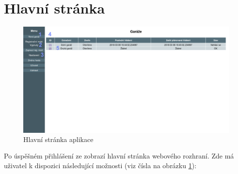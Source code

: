 \newpage

\section{Hlavní stránka}

\begin{figure}[h!]
    \centering
    \includegraphics[width=\textwidth]{images/mainpage.png}
    \caption[Hlavní stránka aplikace]{Hlavní stránka aplikace}
    \label{fig:mainpage}
\end{figure}

Po úspěšném přihlášení ze zobrazí hlavní stránka webového rozhraní. Zde má uživatel k dispozici následující možnosti (viz čísla na obrázku \ref{fig:mainpage}):

